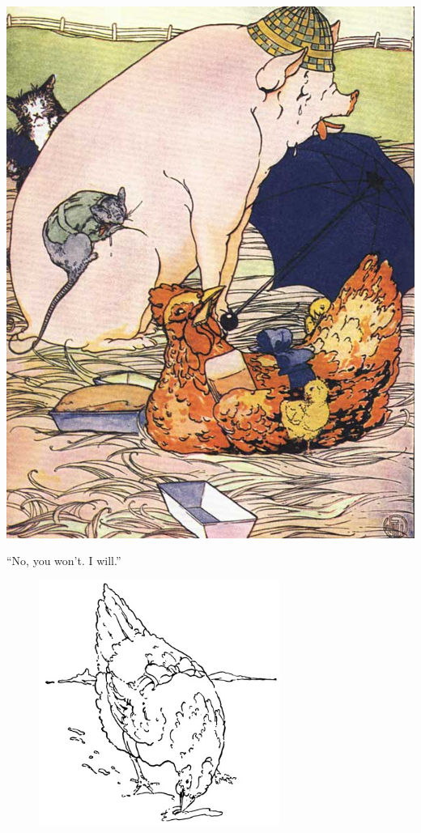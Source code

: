 \documentclass[letterpaper, 10pt, openany]{memoir}
\begin{document}
\newpage
\begin{center}
	\includegraphics[width=\textwidth]{image_053_1.jpg}
\end{center}

\newpage

``No, you won't. I will.''

\vspace{3\onelineskip}

\begin{figure}
	\vspace{-2\onelineskip}
	\includegraphics[width=0.7\textwidth]{image_005_2.jpg}
\end{figure}
\end{document}
